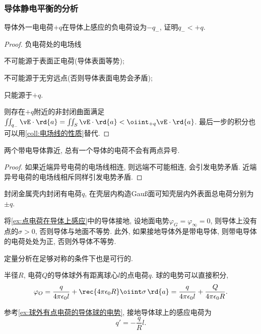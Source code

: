 \documentclass[../Electromagnetism.tex]{subfiles}
\begin{document}

\subsubsection{导体静电平衡的分析} %
\label{ssub:导体静电平衡的分析}

\begin{ex}
	\label{ex:点电荷在导体上感应}
	导体外一电电荷$+q$在导体上感应的负电荷设为$-q_{-}$, 证明$q_{-}<+q$.
\end{ex}
\begin{proof}
	负电荷处的电场线
	\begin{cenum}
		\item 不可能源于表面正电荷(导体表面等势);
		\item 不可能源于无穷远点(否则导体表面电势会矛盾);
		\item 只能源于$+q$.
	\end{cenum}
	则存在$+q$附近的非封闭曲面满足$\iint_{q_{-}} \vE\cdot\rd{a} = \iint_{S} \vE\cdot\rd{a} < \oiint_{+q} \vE\cdot\rd{a}$. 最后一步的积分也可以用\cref{coll:电场线的性质}替代.
\end{proof}
\begin{ex}
	两个带电导体靠近, 总有一个导体的电荷不会有两点异号.
\end{ex}
\begin{proof}
	如果近端异号电荷的电场线相连, 则远端不可能相连, 会引发电势矛盾. 近端异号电荷的电场线相斥同样引发电势矛盾.
\end{proof}
\begin{ex}
	\label{ex:封闭金属壳外表面总电荷}
	封闭金属壳内封闭有电荷$q$, 在壳层内构造Gau\ss 面可知壳层内外表面总电荷分别为$\pm q$.
\end{ex}
\begin{ex}
	\label{ex:导体外有点电荷的接地导体的表面电荷密度}
	将\cref{ex:点电荷在导体上感应}中的导体接地, 设地面电势$\varphi_G = \varphi_\infty = 0$, 则导体上没有点的$\sigma > 0$, 否则导体与地面不等势. 此外, 如果接地导体外是带电导体, 则带电导体的电荷处处为正, 否则外导体不等势.
\end{ex}
定量分析在足够对称的条件下也是可行的.
\begin{ex}
	\label{ex:球外有点电荷的导体球的电势}
	半径$R$, 电荷$Q$的导体球外有距离球心$l$的点电荷$q$. 球的电势可以直接积分,
	\[ \varphi_O = \frac{q}{4\pi\epsilon_0 l} + \rec{4\pi\epsilon_0 R}\oiint \sigma\,\rd{a} = \frac{q}{4\pi\epsilon_0 l} + \frac{Q}{4\pi\epsilon_0 R}. \]
\end{ex}
\begin{ex}
	参考\cref{ex:球外有点电荷的导体球的电势}, 接地导体球上的感应电荷为
	\[ q' = -\frac{q}{R}{l}. \]
\end{ex}
\end{document}
